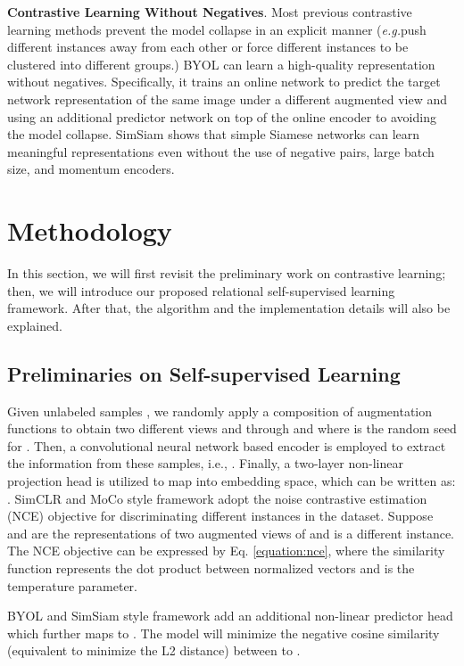 \documentclass{article}
\newcommand{\<}{\left\langle}
\renewcommand{\>}{\right\rangle}
\newcommand{\eg}{{\emph{e.g.}}}
\begin{document}
\textbf{Contrastive Learning Without Negatives}. 
Most previous contrastive learning methods prevent the model collapse in an explicit manner (\eg push different instances away from each other or force different instances to be clustered into different groups.) BYOL \cite{byol} can learn a high-quality representation without negatives. Specifically, it trains an online network to predict the target network representation of the same image under a different augmented view and using an additional predictor network on top of the online encoder to avoiding the model collapse. SimSiam \cite{SimSiam} shows that simple Siamese networks can learn meaningful representations even without the use of negative pairs, large batch size, and momentum encoders.  
\label{section:method}
\section{Methodology}

In this section, we will first revisit the preliminary work on contrastive learning; then, we will introduce our proposed relational self-supervised learning framework. After that, the algorithm and the implementation details will also be explained.

\subsection{Preliminaries on Self-supervised Learning}
Given  unlabeled samples , we randomly apply a composition of augmentation functions  to obtain two different views  and  through  and  where  is the random seed for . Then, a convolutional neural network based encoder  is employed to extract the information from these samples, i.e.,   . Finally, a two-layer non-linear projection head  is utilized to map  into embedding space, which can be written as: . SimCLR \cite{simclr} and MoCo \cite{moco} style framework adopt the noise contrastive estimation (NCE) objective for discriminating different instances in the dataset. Suppose  and  are the representations of two augmented views of  and  is a different instance. The NCE objective can be expressed by Eq. \eqref{equation:nce}, where the similarity function  represents the dot product between  normalized vectors  and  is the temperature parameter. 
\vspace{-3pt}


BYOL \cite{byol} and SimSiam \cite{SimSiam} style framework add an additional non-linear predictor head  which further maps  to . The model will minimize the negative cosine similarity (equivalent to minimize the L2 distance) between  to .  
\vspace{-4pt}
\end{document}

